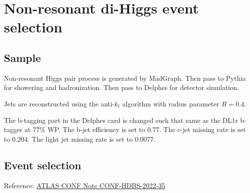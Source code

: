 \documentclass[12pt]{article}
\begin{document}
\section{Non-resonant di-Higgs event selection}%
\label{sec:non_resonant_di_higgs_event_selection}
	\subsection{Sample}%
	\label{sub:sample}
		Non-resonant Higgs pair process is generated by MadGraph. Then pass to Pythia for showering and hadronization. Then pass to Delphes for detector simulation.

		Jets are reconstructed using the anti-$k_t$ algorithm with radius parameter $R = 0.4$.

		The b-tagging part in the Delphes card is changed such that same as the DL1r b-tagger at 77\% WP.  The b-jet eﬀiciency is set to 0.77. The c-jet missing rate is set to 0.204. The light jet missing rate is set to 0.0077.

	\subsection{Event selection}%
	\label{sub:event_selection}
		Reference: \href{https://cds.cern.ch/record/2811390/files/ATLAS-CONF-2022-035.pdf}{ATLAS CONF Note CONF-HDBS-2022-35}
\end{document}
